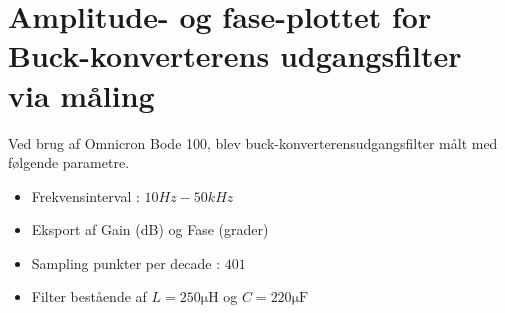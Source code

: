 \section{Amplitude- og fase-plottet for Buck-konverterens udgangsfilter via måling}\label{sec:spm2}
Ved brug af Omnicron Bode 100, blev buck-konverterensudgangsfilter målt med følgende parametre.
\begin{itemize}
	\item Frekvensinterval : $ 10 Hz - 50 kHz  $
	\item Eksport af Gain (dB) og Fase (grader)
	\item Sampling punkter per decade : $401$
	\item Filter bestående af $L=250\si{\micro\henry}$ og $C=220 \si{\micro\farad} $
\end{itemize}